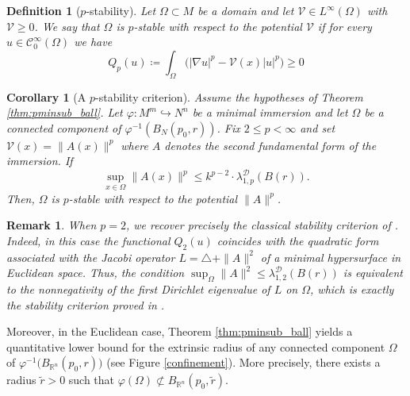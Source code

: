 \documentclass{article}
\newtheorem{cor}[thm]{Corollary}
\newtheorem{remark}[thm]{Remark}
\newtheorem{definition}[thm]{Definition}
\begin{document}
\begin{definition}[$p$-stability]
Let $\Omega \subset M$ be a domain and let $\mathcal V \in L^\infty(\Omega)$ 
with $\mathcal V \ge 0$. 
We say that $\Omega$ is $p$-stable with respect to the potential $\mathcal V$ if for every $u \in \mathcal{C}_0^\infty(\Omega)$ we have
\[
Q_p(u) \coloneq \int_{\Omega} \Big( |\nabla u|^p - \mathcal V(x) |u|^p \Big) \ge 0
\]

\end{definition}
\begin{cor}[A $p$-stability criterion]\label{p-stability}
Assume the hypotheses of Theorem \ref{thm:pminsub_ball}.
Let $\varphi : M^m \hookrightarrow N^n$ be a minimal immersion and let 
$\Omega$ be a connected component of 
$\varphi^{-1}(B_N(p_0,r))$.
Fix $2 \le p < \infty$ and set $\mathcal V(x) = \|A(x)\|^p$ where $A$ denotes the second fundamental form of the immersion. If
\[
\sup_{x \in \Omega} \|A(x)\|^p 
\leq k^{p-2} \cdot \lambda_{1,p}^{\mathcal D}(B(r)).
\]
Then, $\Omega$ is $p$-stable with respect to the potential $\|A\|^p$.
\end{cor} 
\begin{remark}
When $p=2$, we recover precisely the classical stability criterion of \cite{BessaMontenegro2003}. Indeed, in this case the functional $Q_2(u)$ coincides with the quadratic form associated with the Jacobi operator $L=\triangle+\|A\|^2$ of a minimal hypersurface in Euclidean space. Thus, the condition $\sup_{\Omega}\|A\|^2 \leq \lambda_{1,2}^{\mathcal D}(B(r))$ is equivalent to the nonnegativity of the first Dirichlet eigenvalue of $L$ on $\Omega$, which is exactly the stability criterion proved in \cite[Corollary 1.12]{BessaMontenegro2003}.
\end{remark}

Moreover, in the Euclidean case, Theorem \ref{thm:pminsub_ball} yields a quantitative lower bound for the extrinsic radius of any
connected component $\Omega$ of $\varphi^{-1}\!\big(B_{\mathbb{R}^{n}}(p_{0},r)\big)$ (see Figure \eqref{confinement}). More precisely, there exists a radius $\widetilde r>0$ such that $\varphi(\Omega)\not\subset B_{\mathbb{R}^{n}}(p_{0},\widetilde r)$.
\end{document}
